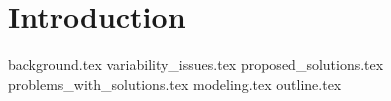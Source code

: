 \documentclass[../thesis.tex]{subfiles}
\begin{document}
\chapter{Introduction}

{background.tex}
{variability_issues.tex}
{proposed_solutions.tex}
{problems_with_solutions.tex}
{modeling.tex}
{outline.tex}
\end{document}
